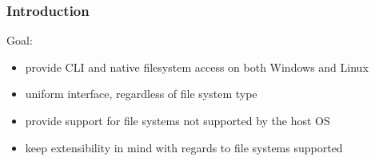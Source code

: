 

\begin{frame}

\frametitle{Introduction}
    \begin{block}{Goal:}
        \begin{itemize}
        \item provide CLI and native filesystem access on both Windows and Linux
        \item uniform interface, regardless of file system type
        \item provide support for file systems not supported by the host OS
        \item keep extensibility in mind with regards to file systems supported
        \end{itemize}
    \end{block}

\end{frame}